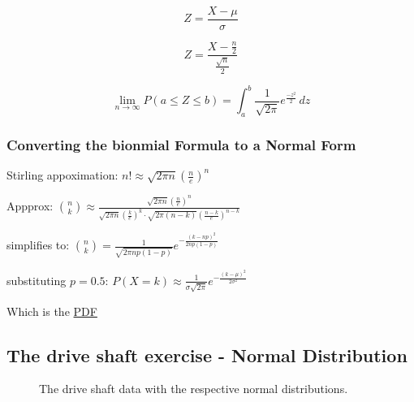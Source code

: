 \documentclass[
  a4paper,
]{scrbook}
\begin{document}
\[Z = \frac{X-\mu}{\sigma}\]

\[Z = \frac{X-\frac{n}{2}}{\frac{\sqrt{n}}{2}}\]

\[\lim_{n\to\infty} P(a\leq Z \leq b)= \int_a^b \frac{1}{\sqrt{2\pi}}e^\frac{-z^2}{2} \,dz \]

\subsubsection{Converting the bionmial Formula to a Normal
Form}\label{converting-the-bionmial-formula-to-a-normal-form}

Stirling appoximation:
\(n!\approx\sqrt{2\pi n} \left( \frac{n}{e} \right)^n\)

Appprox:
\(\binom{n}{k} \approx \frac{\sqrt{2\pi n} \left( \frac{n}{e} \right)^n}{\sqrt{2\pi n} \left( \frac{k}{e} \right)^k \cdot \sqrt{2\pi(n-k)} \left( \frac{n-k}{e} \right)^{n-k}}\)

simplifies to:
\(\binom{n}{k} = \frac{1}{\sqrt{2\pi n p (1-p)}}e^{-\frac{(k-np)^2}{2np(1-p)}}\)

substituting \(p=0.5\):
\(P(X = k) \approx \frac{1}{\sigma\sqrt{2\pi}}e^{-\frac{(k-\mu)^2}{2\sigma^2}}\)

Which is the \hyperref[acronyms_PDF]{PDF}

\subsection{The drive shaft exercise - Normal
Distribution}\label{the-drive-shaft-exercise---normal-distribution}

\begin{figure}[ht]


\caption{\label{fig-ds-nd}The drive shaft data with the respective
normal distributions.}

\end{figure}%
\end{document}

